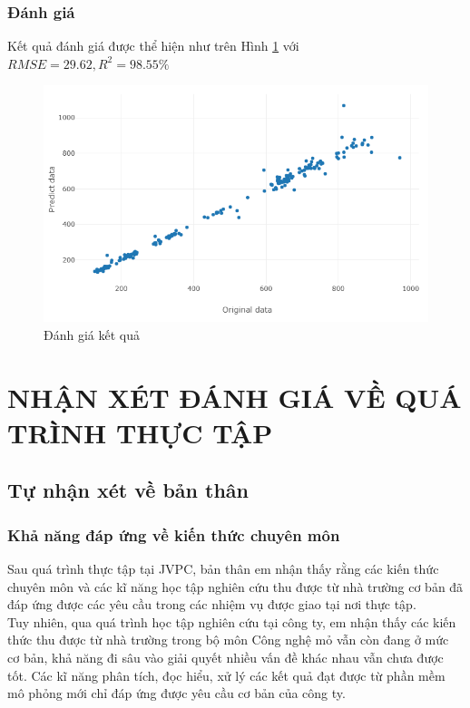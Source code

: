 \documentclass[12pt,a4paper]{report}
\begin{document}
\subsection{Đánh giá}
Kết quả đánh giá được thể hiện như trên Hình \ref{fig:relationship} với $RMSE = 29.62, R^2 = 98.55\%$
    \begin{figure}[h]
        \centering
        \includegraphics[scale=.85]{fig/relationship.PNG}
        \caption{Đánh giá kết quả}
        \label{fig:relationship}
    \end{figure}


\chapter{NHẬN XÉT ĐÁNH GIÁ VỀ QUÁ TRÌNH THỰC TẬP}
\section{Tự nhận xét về bản thân}
\subsection{Khả năng đáp ứng về kiến thức chuyên môn}
Sau quá trình thực tập tại JVPC, bản thân em nhận thấy rằng các kiến thức chuyên môn và các kĩ năng học tập nghiên cứu thu được từ nhà trường cơ bản đã đáp ứng được các yêu cầu trong các nhiệm vụ được giao tại nơi thực tập.\\
Tuy nhiên, qua quá trình học tập nghiên cứu tại công ty, em nhận thấy các kiến thức thu được từ nhà trường trong bộ môn Công nghệ mỏ vẫn còn đang ở mức cơ bản, khả năng đi sâu vào giải quyết nhiều vấn đề khác nhau vẫn chưa được tốt. Các kĩ năng phân tích, đọc hiểu, xử lý các kết quả đạt được từ phần mềm mô phỏng mới chỉ đáp ứng được yêu cầu cơ bản của công ty.
\end{document}
